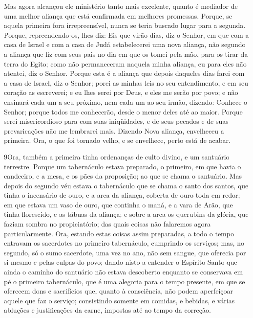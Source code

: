 Mas agora alcançou ele ministério tanto mais excelente, quanto é
mediador de uma melhor aliança que está confirmada em melhores
promessas. Porque, se aquela primeira fora irrepreensível, nunca
se teria buscado lugar para a segunda. Porque, repreendendo-os,
lhes diz: Eis que virão dias, diz o Senhor, em que com a casa de
Israel e com a casa de Judá estabelecerei uma nova aliança, não
segundo a aliança que fiz com seus pais no dia em que os tomei pela
mão, para os tirar da terra do Egito; como não permaneceram naquela
minha aliança, eu para eles não atentei, diz o Senhor. Porque
esta é a aliança que depois daqueles dias farei com a casa de
Israel, diz o Senhor; porei as minhas leis no seu entendimento, e em
seu coração as escreverei; e eu lhes serei por Deus, e eles me serão
por povo; e não ensinará cada um a seu próximo, nem cada um
ao seu irmão, dizendo: Conhece o Senhor; porque todos me conhecerão,
desde o menor deles até ao maior. Porque serei misericordioso
para com suas iniqüidades, e de seus pecados e de suas prevaricações
não me lembrarei mais. Dizendo Nova aliança, envelheceu a
primeira. Ora, o que foi tornado velho, e se envelhece, perto está
de acabar.

\medskip

\lettrine{9} Ora, também a primeira tinha ordenanças de culto
divino, e um santuário terrestre. Porque um tabernáculo estava
preparado, o primeiro, em que havia o candeeiro, e a mesa, e os pães
da proposição; ao que se chama o santuário. Mas depois do
segundo véu estava o tabernáculo que se chama o santo dos santos,
que tinha o incensário de ouro, e a arca da aliança, coberta de
ouro toda em redor; em que estava um vaso de ouro, que continha o
maná, e a vara de Arão, que tinha florescido, e as tábuas da
aliança; e sobre a arca os querubins da glória, que faziam
sombra no propiciatório; das quais coisas não falaremos agora
particularmente. Ora, estando estas coisas assim preparadas, a
todo o tempo entravam os sacerdotes no primeiro tabernáculo,
cumprindo os serviços; mas, no segundo, só o sumo sacerdote, uma
vez no ano, não sem sangue, que oferecia por si mesmo e pelas culpas
do povo; dando nisto a entender o Espírito Santo que ainda o
caminho do santuário não estava descoberto enquanto se conservava em
pé o primeiro tabernáculo, que é uma alegoria para o tempo
presente, em que se oferecem dons e sacrifícios que, quanto à
consciência, não podem aperfeiçoar aquele que faz o serviço;
consistindo somente em comidas, e bebidas, e várias abluções
e justificações da carne, impostas até ao tempo da correção.


